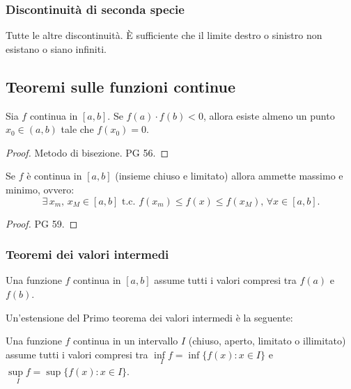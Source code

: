 \subsubsection{Discontinuità di seconda specie}
Tutte le altre discontinuità. È sufficiente che il limite destro o sinistro non esistano o siano infiniti.

\subsection{Teoremi sulle funzioni continue}
\begin{theorem}\label{th:esistenza_degli_zeri}
    Sia $f$ continua in $[a,b]$. Se $f(a)\cdot f(b)<0$, allora esiste almeno un punto $x_0\in(a,b)$ tale che $f(x_0)=0$.
\end{theorem}
\begin{proof}
    Metodo di bisezione. PG 56.
\end{proof}

\begin{theorem}
    Se $f$ è continua in $[a,b]$ (insieme chiuso e limitato) allora ammette massimo e minimo, ovvero:
    \begin{equation*}
        \exists\, x_m,\, x_M\in[a,b]\text{ t.c. } f(x_m)\leq f(x)\leq f(x_M),\,\forall x\in[a,b].
    \end{equation*}
\end{theorem}
\begin{proof}
    PG 59.
\end{proof}

\subsubsection{Teoremi dei valori intermedi}

\begin{theorem}
    Una funzione $f$ continua in $[a,b]$ assume tutti i valori compresi tra $f(a)$ e $f(b)$.
\end{theorem}

Un'estensione del Primo teorema dei valori intermedi è la seguente:

\begin{proposition}
    Una funzione $f$ continua in un intervallo $I$ (chiuso, aperto, limitato o illimitato) assume tutti i valori compresi tra $\underset{I}{\inf f}=\inf\{f(x)\colon x\in I\}$ e $\underset{I}{\sup f}=\sup\{f(x)\colon x\in I\}$.
\end{proposition}

